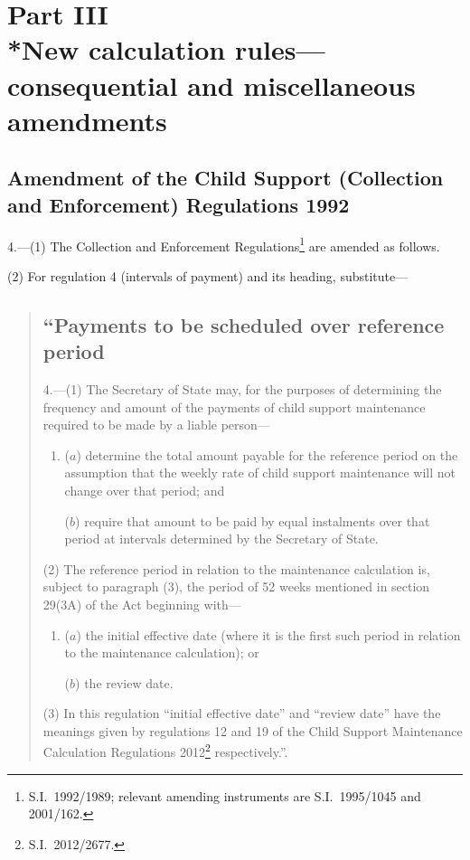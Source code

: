 \documentclass[12pt,a4paper]{article}
\begin{document}
\section[Part III --- New calculation rules---consequential and miscellaneous amendments]{Part III\\*New calculation rules---consequential and miscellaneous amendments}

\renewcommand\parthead{--- Part III}

\subsection[4. Amendment of the Child Support (Collection and Enforcement) Regulations 1992]{Amendment of the Child Support (Collection and Enforcement) Regulations 1992}

4.---(1)  The Collection and Enforcement Regulations\footnote{S.I.~1992/1989; relevant amending instruments are S.I.~1995/1045 and 2001/162.} are amended as follows.

(2) For regulation 4 (intervals of payment) and its heading, substitute—
\begin{quotation}
\subsection*{“Payments to be scheduled over reference period}

4.---(1)  The Secretary of State may, for the purposes of determining the frequency and amount of the payments of child support maintenance required to be made by a liable person—
\begin{enumerate}\item[]
($a$) determine the total amount payable for the reference period on the assumption that the weekly rate of child support maintenance will not change over that period; and

($b$) require that amount to be paid by equal instalments over that period at intervals determined by the Secretary of State.
\end{enumerate}

(2) The reference period in relation to the maintenance calculation is, subject to paragraph (3), the period of 52 weeks mentioned in section 29(3A) of the Act beginning with—
\begin{enumerate}\item[]
($a$) the initial effective date (where it is the first such period in relation to the maintenance calculation); or

($b$) the review date.
\end{enumerate}

(3) In this regulation “initial effective date” and “review date” have the meanings given by regulations 12 and 19 of the Child Support Maintenance Calculation Regulations 2012\footnote{S.I.~2012/2677.} respectively.”.
\end{quotation}
\end{document}
